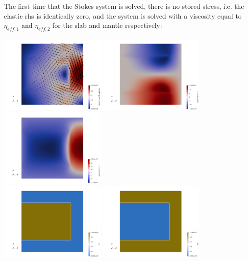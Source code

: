 \newpage
The first time that the Stokes system is solved, there is no stored stress, i.e. the 
elastic rhs is identically zero, and the system is solved with a viscosity equal to
$\eta_{eff,1}$ and $\eta_{eff,2}$ for the slab and mantle respectively:

\begin{center}
\includegraphics[width=5.2cm]{python_codes/fieldstone_64/results/slab/init/vel}
\includegraphics[width=5.2cm]{python_codes/fieldstone_64/results/slab/init/u}
\includegraphics[width=5.2cm]{python_codes/fieldstone_64/results/slab/init/v}\\
\includegraphics[width=5.2cm]{python_codes/fieldstone_64/results/slab/init/C1}
\includegraphics[width=5.2cm]{python_codes/fieldstone_64/results/slab/init/C2}

\end{center}
